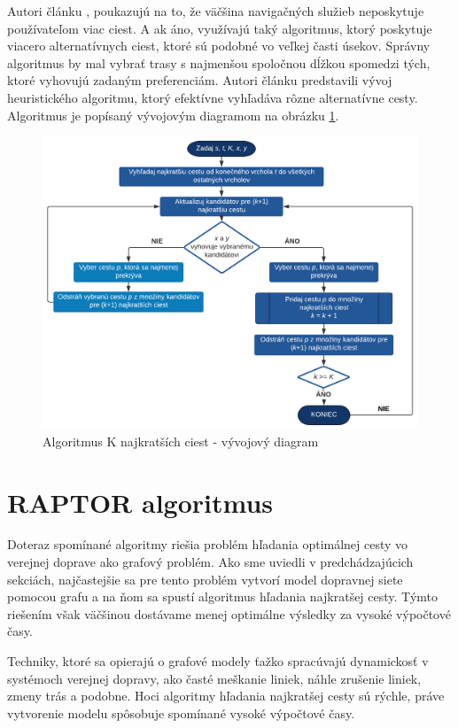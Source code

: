 Autori článku \cite{dissimilar}, poukazujú na to, že väčšina navigačných služieb neposkytuje používateľom viac ciest. A ak áno, využívajú taký algoritmus, ktorý poskytuje viacero alternatívnych ciest, ktoré sú podobné vo veľkej časti úsekov. Správny algoritmus by mal vybrať trasy s najmenšou spoločnou dĺžkou spomedzi tých, ktoré vyhovujú zadaným preferenciám. Autori článku predstavili vývoj heuristického algoritmu, ktorý efektívne vyhľadáva rôzne alternatívne cesty. Algoritmus je popísaný vývojovým diagramom na obrázku \ref{fig:flowchart}.

\begin{figure}[H]
\centerline{\includegraphics[width=1.0\textwidth]{images/flow-chart}}
\caption[Algoritmus K najkratších ciest - vývojový diagram]{Algoritmus K najkratších ciest - vývojový diagram}
\label{fig:flowchart}
\end{figure}

\section{RAPTOR algoritmus}
\label{sec:raptor}
Doteraz spomínané algoritmy riešia problém hľadania optimálnej cesty vo verejnej doprave ako grafový problém. Ako sme uviedli v predchádzajúcich sekciách, najčastejšie sa pre tento problém vytvorí model dopravnej siete pomocou grafu a na ňom sa spustí algoritmus hľadania najkratšej cesty. Týmto riešením však väčšinou dostávame menej optimálne výsledky za vysoké výpočtové časy.

Techniky, ktoré sa opierajú o grafové modely ťažko spracúvajú dynamickosť v systémoch verejnej dopravy, ako časté meškanie liniek, náhle zrušenie liniek, zmeny trás a podobne. Hoci algoritmy hľadania najkratšej cesty sú rýchle, práve vytvorenie modelu spôsobuje spomínané vysoké výpočtové časy.

